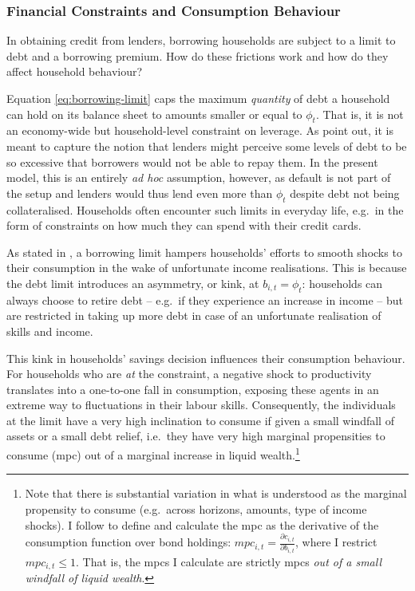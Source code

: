 \documentclass[a4paper,12pt]{article} %
\numberwithin{equation}{section} %
\numberwithin{figure}{section}
\numberwithin{table}{section}
\begin{document}
\subsubsection{Financial Constraints and Consumption Behaviour}
\label{sec:model-hh-constraints}

In obtaining credit from lenders, borrowing households are subject to a limit to debt and a borrowing premium. How do these frictions work and how do they affect household behaviour?

Equation \eqref{eq:borrowing-limit} caps the maximum \textit{quantity} of debt a household can hold on its balance sheet to amounts smaller or equal to $\phi_t$. That is, it is not an economy-wide but household-level constraint on leverage. As \textcite{egg2012} point out, it is meant to capture the notion that lenders might perceive some levels of debt to be so excessive that borrowers would not be able to repay them. In the present model, this is an entirely \textit{ad hoc} assumption, however, as default is not part of the setup and lenders would thus lend even more than $\phi_t$ despite debt not being collateralised. Households often encounter such limits in everyday life, e.g.~in the form of constraints on how much they can spend with their credit cards.

As stated in \textcite{carroll2021}, a borrowing limit hampers households' efforts to smooth shocks to their consumption in the wake of unfortunate income realisations. This is because the debt limit introduces an asymmetry, or kink, at $b_{i,t} = \phi_t$: households can always choose to retire debt -- e.g.~if they experience an increase in income -- but are restricted in taking up more debt in case of an unfortunate realisation of skills and income. 

This kink in households' savings decision influences their consumption behaviour. For households who are \textit{at} the constraint, a negative shock to productivity translates into a one-to-one fall in consumption, exposing these agents in an extreme way to fluctuations in their labour skills. Consequently, the individuals at the limit have a very high inclination to consume if given a small windfall of assets or a small debt relief, i.e.~they have very high marginal propensities to consume (\Gls{mpc}) out of a marginal increase in liquid wealth.\footnote{Note that there is substantial variation in what is understood as the marginal propensity to consume (e.g.~across horizons, amounts, type of income shocks). I follow \textcite{gl2017} to define and calculate the \Gls{mpc} as the derivative of the consumption function over bond holdings: $mpc_{i,t} = \frac{\partial c_{i,t}}{\partial b_{i,t}}$, where I restrict $mpc_{i,t} \le 1$. That is, the \Gls{mpc}s I calculate are strictly \Gls{mpc}s \textit{out of a small windfall of liquid wealth}.}
\end{document}
